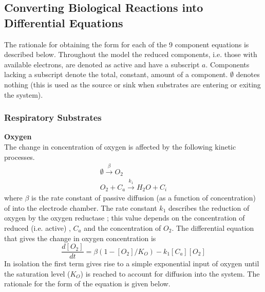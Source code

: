 
\subsection{Converting Biological Reactions into Differential Equations}
The rationale for obtaining the form for each of the 9 component equations is described below. Throughout the model the reduced components, i.e. those with available electrons, are denoted as active and have a subscript $a$. Components lacking a subscript denote the total, constant, amount of a component. $\emptyset$ denotes nothing (this is used as the source or sink when substrates are entering or exiting the system).

\subsubsection{Respiratory Substrates}
{\bf Oxygen}\\
The change in concentration of oxygen is affected by the following kinetic processes.
\begin{equation*}
\begin{gathered}
\emptyset\xrightarrow{\beta} O_2\\
O_2 + C_a\xrightarrow{k_1} H_{2}O + C_i
\end{gathered}
\end{equation*}
where $\beta$ is the rate constant of passive diffusion (as a function of \cOxygen{} concentration) of \cOxygen{} into the electrode chamber. The rate constant $k_1$ describes the reduction of oxygen by the oxygen reductase \cbbthree{}; this value depends on the concentration of reduced (i.e. active) \cbbthree{}, $C_a$ and the concentration of $O_2$.
The differential equation that gives the change in oxygen concentration is
\begin{equation}
\frac{d[O_2]}{dt} = \beta(1-[O_2]/K_O) - k_{1}[C_a][O_2]
\label{eq:oxygen}
\end{equation}
In isolation the first term gives rise to a simple exponential input of oxygen until the saturation level ($K_O$) is reached to account for diffusion into the system. The rationale for the form of the equation is given below.


